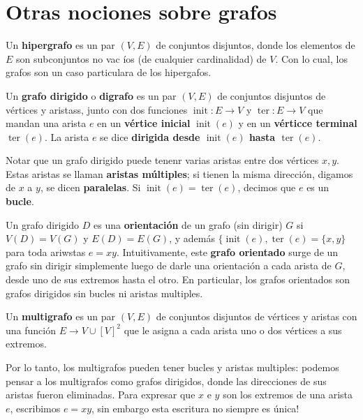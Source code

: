 \documentclass[../main.tex]{subfiles}
\begin{document}
\section[]{Otras nociones sobre grafos}

\begin{definition}
Un \textbf{hipergrafo} es un par $(V,E)$ de conjuntos disjuntos, donde los elementos de $E$ son subconjuntos no vac
íos (de cualquier cardinalidad) de $V$. Con lo cual, los grafos son un caso particulara de los hipergafos.
\end{definition}

\begin{definition}
    Un \textbf{grafo dirigido} o \textbf{digrafo} es un par $(V,E)$ de conjuntos disjuntos de vértices y aristass,
    junto con dos funciones $\operatorname{init}: E \rightarrow V$ y $\operatorname{ter} : E \rightarrow V$ que
    mandan una arista $e$ en un \textbf{vértice inicial} $\operatorname{init}(e)$ y en un \textbf{vérticce terminal} $\operatorname{ter}(e)$. La arista $e$ se dice \textbf{dirigida desde $\operatorname{init}(e)$ hasta $\operatorname{ter}(e)$}.
\end{definition}
Notar que un grafo dirigido puede tenenr varias aristas entre dos vértices $x,y$. Estas aristas se llaman \textbf{
aristas múltiples}; si tienen la misma dirección, digamos de $x$ a $y$, se dicen \textbf{paralelas}. Si $\operatorname{init}(e) = \operatorname{ter}(e)$, decimos que $e$ es un \textbf{bucle}.

Un grafo dirigido $D$ es una \textbf{orientación} de un grafo (sin dirigir) $G$ si $V(D) = V(G) $ y $E (D) = E(G)$, y
 además $\{ \operatorname{init}(e), \operatorname{ter}(e)= \{x,y\}$ para toda ariwstas $e = xy$. Intuitivamente, este \textbf{grafo orientado} surge de un grafo sin dirigir simplemente luego de darle una orientación a cada arista de $G$, desde uno de sus extremos hasta el otro. En particular, los grafos orientados son grafos dirigidos sin bucles ni aristas multiples.

 \begin{definition}
     Un \textbf{multigrafo} es un par $(V,E)$ de conjuntos disjuntos de vértices y aristas con una función $E \rightarrow V \cup [V]^2$ que le asigna a cada arista uno o dos vértices a sus extremos.
 \end{definition}
Por lo tanto, los multigrafos pueden tener bucles y aristas multiples: podemos pensar a los multigrafos como grafos
dirigidos, donde las direcciones de sus aristas fueron eliminadas. Para expresar que $x$ e $y$ son los extremos de
una arista $e$, escribimos $e = xy$, sin embargo esta escritura no siempre es única!
\end{document}
